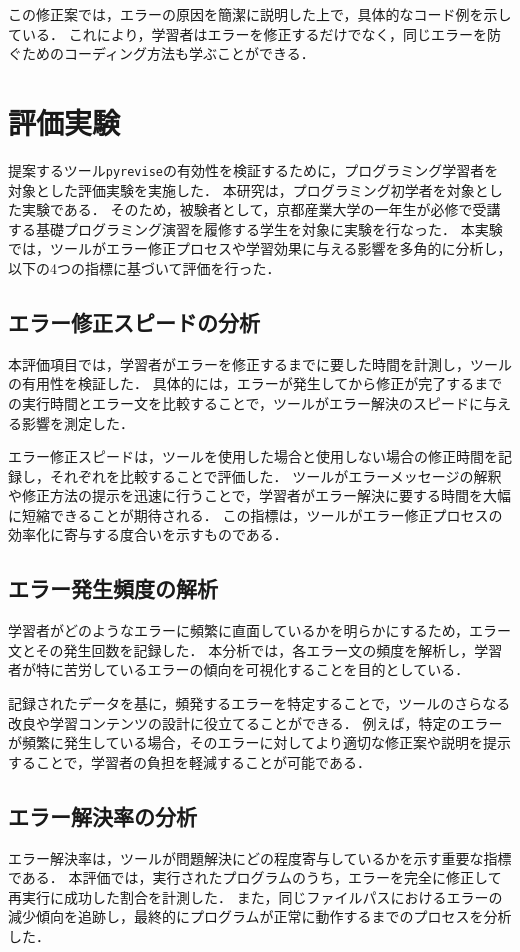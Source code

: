 \documentclass[12pt,twoside]{jbook}
\newcommand{\pyrevise}{\texttt{pyrevise}}
\begin{document}
この修正案では，エラーの原因を簡潔に説明した上で，具体的なコード例を示している．
これにより，学習者はエラーを修正するだけでなく，同じエラーを防ぐためのコーディング方法も学ぶことができる．

\chapter{評価実験}
提案するツール\pyrevise の有効性を検証するために，プログラミング学習者を対象とした評価実験を実施した．
本研究は，プログラミング初学者を対象とした実験である．
そのため，被験者として，京都産業大学の一年生が必修で受講する基礎プログラミング演習を履修する学生を対象に実験を行なった．
本実験では，ツールがエラー修正プロセスや学習効果に与える影響を多角的に分析し，以下の4つの指標に基づいて評価を行った．

\section{エラー修正スピードの分析}
本評価項目では，学習者がエラーを修正するまでに要した時間を計測し，ツールの有用性を検証した．
具体的には，エラーが発生してから修正が完了するまでの実行時間とエラー文を比較することで，ツールがエラー解決のスピードに与える影響を測定した．

エラー修正スピードは，ツールを使用した場合と使用しない場合の修正時間を記録し，それぞれを比較することで評価した．
ツールがエラーメッセージの解釈や修正方法の提示を迅速に行うことで，学習者がエラー解決に要する時間を大幅に短縮できることが期待される．
この指標は，ツールがエラー修正プロセスの効率化に寄与する度合いを示すものである．

\section{エラー発生頻度の解析}
学習者がどのようなエラーに頻繁に直面しているかを明らかにするため，エラー文とその発生回数を記録した．
本分析では，各エラー文の頻度を解析し，学習者が特に苦労しているエラーの傾向を可視化することを目的としている．

記録されたデータを基に，頻発するエラーを特定することで，ツールのさらなる改良や学習コンテンツの設計に役立てることができる．
例えば，特定のエラーが頻繁に発生している場合，そのエラーに対してより適切な修正案や説明を提示することで，学習者の負担を軽減することが可能である．

\section{エラー解決率の分析}
エラー解決率は，ツールが問題解決にどの程度寄与しているかを示す重要な指標である．
本評価では，実行されたプログラムのうち，エラーを完全に修正して再実行に成功した割合を計測した．
また，同じファイルパスにおけるエラーの減少傾向を追跡し，最終的にプログラムが正常に動作するまでのプロセスを分析した．
\end{document}
